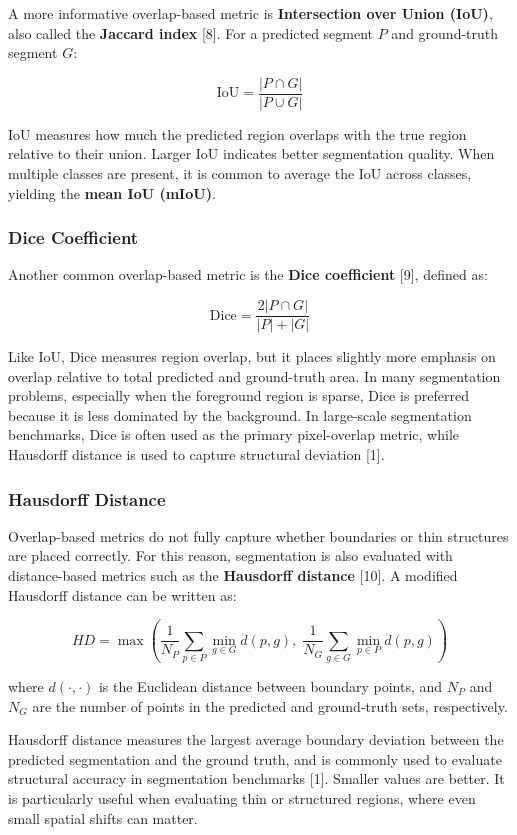 \documentclass{article}
\renewcommand{\cite}[1]{[#1]}
\begin{document}
A more informative overlap-based metric is \textbf{Intersection over Union (IoU)}, also called the \textbf{Jaccard index} \cite{8}. For a predicted segment $P$ and ground-truth segment $G$:

\[
\text{IoU} = \frac{|P \cap G|}{|P \cup G|}
\]

IoU measures how much the predicted region overlaps with the true region relative to their union. Larger IoU indicates better segmentation quality. When multiple classes are present, it is common to average the IoU across classes, yielding the \textbf{mean IoU (mIoU)}.

\subsubsection{Dice Coefficient}

Another common overlap-based metric is the \textbf{Dice coefficient} \cite{9}, defined as:

\[
\text{Dice} = \frac{2|P \cap G|}{|P| + |G|}
\]

Like IoU, Dice measures region overlap, but it places slightly more emphasis on overlap relative to total predicted and ground-truth area. In many segmentation problems, especially when the foreground region is sparse, Dice is preferred because it is less dominated by the background. In large-scale segmentation benchmarks, Dice is often used as the primary pixel-overlap metric, while Hausdorff distance is used to capture structural deviation \cite{1}.

\subsubsection{Hausdorff Distance}

Overlap-based metrics do not fully capture whether boundaries or thin structures are placed correctly. For this reason, segmentation is also evaluated with distance-based metrics such as the \textbf{Hausdorff distance} \cite{10}. A modified Hausdorff distance can be written as:

\[
HD = \max \left(
\frac{1}{N_P}\sum_{p \in P} \min_{g \in G} d(p,g),
\;
\frac{1}{N_G}\sum_{g \in G} \min_{p \in P} d(p,g)
\right)
\]

where $d(\cdot,\cdot)$ is the Euclidean distance between boundary points, and $N_P$ and $N_G$ are the number of points in the predicted and ground-truth sets, respectively.

Hausdorff distance measures the largest average boundary deviation between the predicted segmentation and the ground truth, and is commonly used to evaluate structural accuracy in segmentation benchmarks \cite{1}. Smaller values are better. It is particularly useful when evaluating thin or structured regions, where even small spatial shifts can matter.
\end{document}
